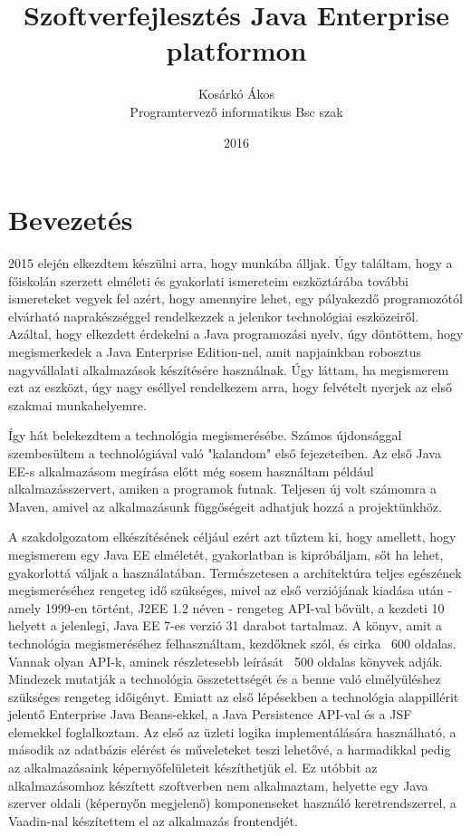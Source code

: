 \documentclass[centeredchapter]{thesis-ekf}
\institute{Matematikai és Informatikai Intézet}
\title{Szoftverfejlesztés Java Enterprise platformon}
\author{Kosárkó Ákos \\ Programtervező informatikus Bsc szak}
\date{2016}
\theoremstyle{definition}
\theoremstyle{remark}
\begin{document}
\maketitle
\tableofcontents


\chapter*{Bevezetés}

2015 elején elkezdtem készülni arra, hogy munkába álljak. Úgy találtam, hogy a főiskolán szerzett elméleti és gyakorlati ismereteim eszköztárába további ismereteket vegyek fel azért, hogy amennyire lehet, egy pályakezdő programozótól elvárható naprakészséggel rendelkezzek a jelenkor technológiai eszközeiről. Azáltal, hogy elkezdett érdekelni a Java programozási nyelv, úgy döntöttem, hogy megismerkedek a Java Enterprise Edition-nel, amit napjainkban robosztus nagyvállalati alkalmazások készítésére használnak. Úgy láttam, ha megismerem ezt az eszközt, úgy nagy eséllyel rendelkezem arra, hogy felvételt nyerjek az első szakmai munkahelyemre.

Így hát belekezdtem a technológia megismerésébe. Számos újdonsággal szembesültem a technológiával való "kalandom" első fejezeteiben. Az első Java EE-s alkalmazásom megírása előtt még sosem használtam például alkalmazásszervert, amiken a programok futnak. Teljesen új volt számomra a Maven, amivel az alkalmazásunk függőségeit adhatjuk hozzá a projektünkhöz.

A szakdolgozatom elkészítésének céljául ezért azt tűztem ki, hogy amellett, hogy megismerem egy Java EE elméletét, gyakorlatban is kipróbáljam, sőt ha lehet, gyakorlottá váljak a használatában. Természetesen a architektúra teljes egészének megismeréséhez rengeteg idő szükséges, mivel az első verziójának kiadása után - amely 1999-en történt, J2EE 1.2 néven - rengeteg API-val bővült, a kezdeti 10 helyett a jelenlegi, Java EE 7-es verzió 31 darabot tartalmaz. A könyv, amit a technológia megismeréséhez felhasználtam, kezdőknek szól, és cirka ~600 oldalas. Vannak olyan API-k, aminek részletesebb leírását ~500 oldalas könyvek adják. Mindezek mutatják a technológia összetettségét és a benne való elmélyüléshez szükséges rengeteg időigényt. Emiatt az első lépésekben a technológia alappillérit jelentő Enterprise Java Beans-ekkel, a Java Persistence API-val és a JSF elemekkel foglalkoztam. Az első az üzleti logika implementálására használható, a második az adatbázis elérést és műveleteket teszi lehetővé, a harmadikkal pedig az alkalmazásaink képernyőfelületeit készíthetjük el. Ez utóbbit az alkalmazásomhoz készített szoftverben nem alkalmaztam, helyette egy Java szerver oldali (képernyőn megjelenő) komponenseket használó keretrendszerrel, a Vaadin-nal készítettem el az alkalmazás frontendjét.
\end{document}
